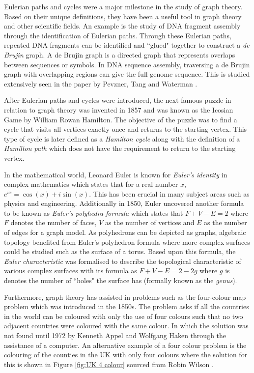 Eulerian paths and cycles were a major milestone in the study of graph theory. Based on their unique definitions, they have been a useful tool in graph theory and other scientific fields. An example is the study of DNA fragment assembly through the identification of Eulerian paths. Through these Eulerian paths, repeated DNA fragments can be identified and ``glued" together to construct a \emph{de Brujin} graph. A de Brujin graph is a directed graph that represents overlaps between sequences or symbols. In DNA sequence assembly, traversing a de Brujin graph with overlapping regions can give the full genome sequence. This is studied extensively seen in the paper by Pevzner, Tang and Waterman \cite{pevzner2001eulerian}.

After Eulerian paths and cycles \cite {victor2010eulerian} were introduced, the next famous puzzle in relation to graph theory was invented in 1857 and was known as the Icosian Game \cite{carlson_2022} by William Rowan Hamilton. The objective of the puzzle was to find a cycle that visits all vertices exactly once and returns to the starting vertex. This type of cycle is later defined as a \emph{Hamilton cycle} \cite{rahman2005hamiltonian} along with the definition of a \emph{Hamilton path} which does not have the requirement to return to the starting vertex.

In the mathematical world, Leonard Euler is known for \emph{Euler's identity} in complex mathematics which states that for a real number $x$, $e^{ix}=\cos(x)+i\sin(x)$. This has been crucial in many subject areas such as physics and engineering. Additionally in 1850, Euler uncovered another formula to be known as \emph{Euler's polyhedra formula} which states that $F + V - E = 2$ where $F$ denotes the number of faces, $V$ as the number of vertices and $E$ as the number of edges for a graph model. As polyhedrons can be depicted as graphs, algebraic topology benefited from Euler's polyhedron formula where more complex surfaces could be studied such as the surface of a torus. Based upon this formula, the \emph{Euler characteristic} was formalised to describe the topological characteristic of various complex surfaces with its formula as $F + V - E = 2 - 2g$ where $g$ is denotes the number of ``holes" the surface has (formally known as the \emph{genus}). 

Furthermore, graph theory has assisted in problems such as the four-colour map problem which was introduced in the 1850s. The problem asks if all the countries in the world can be coloured with only the use of four colours such that no two adjacent countries were coloured with the same colour. In which the solution was not found until 1972 by Kenneth Appel and Wolfgang Haken \cite{Ohnishi2009} through the assistance of a computer. An alternative example of a four colour problem is the colouring of the counties in the UK with only four colours where the solution for this is shown in Figure \ref{fig:UK 4 colour} sourced from Robin Wilson \cite{4ColourRobin}.

